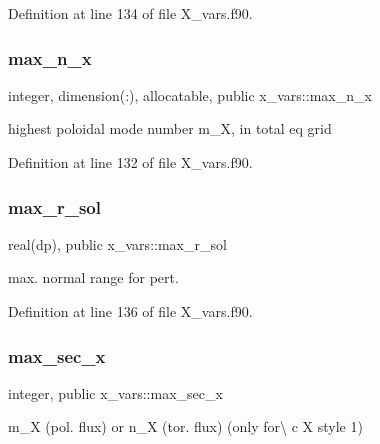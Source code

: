 Definition at line 134 of file X\+\_\+vars.\+f90.

\mbox{\label{namespacex__vars_a2f04400f8c1489db3f2d66fa972852a5}} 
\subsubsection{\texorpdfstring{max\+\_\+n\+\_\+x}{max\_n\_x}}
{\footnotesize\ttfamily integer, dimension(\+:), allocatable, public x\+\_\+vars\+::max\+\_\+n\+\_\+x}



highest poloidal mode number {\ttfamily m\+\_\+X}, in total eq grid 



Definition at line 132 of file X\+\_\+vars.\+f90.

\mbox{\label{namespacex__vars_a0f45dfddb928623424eeb8b8bdd2b0f9}} 
\subsubsection{\texorpdfstring{max\+\_\+r\+\_\+sol}{max\_r\_sol}}
{\footnotesize\ttfamily real(dp), public x\+\_\+vars\+::max\+\_\+r\+\_\+sol}



max. normal range for pert. 



Definition at line 136 of file X\+\_\+vars.\+f90.

\mbox{\label{namespacex__vars_ae19ca528c5688228ff20912a45290b2a}} 
\subsubsection{\texorpdfstring{max\+\_\+sec\+\_\+x}{max\_sec\_x}}
{\footnotesize\ttfamily integer, public x\+\_\+vars\+::max\+\_\+sec\+\_\+x}



{\ttfamily m\+\_\+X} (pol. flux) or {\ttfamily n\+\_\+X} (tor. flux) (only for\textbackslash{} c X style 1) 



